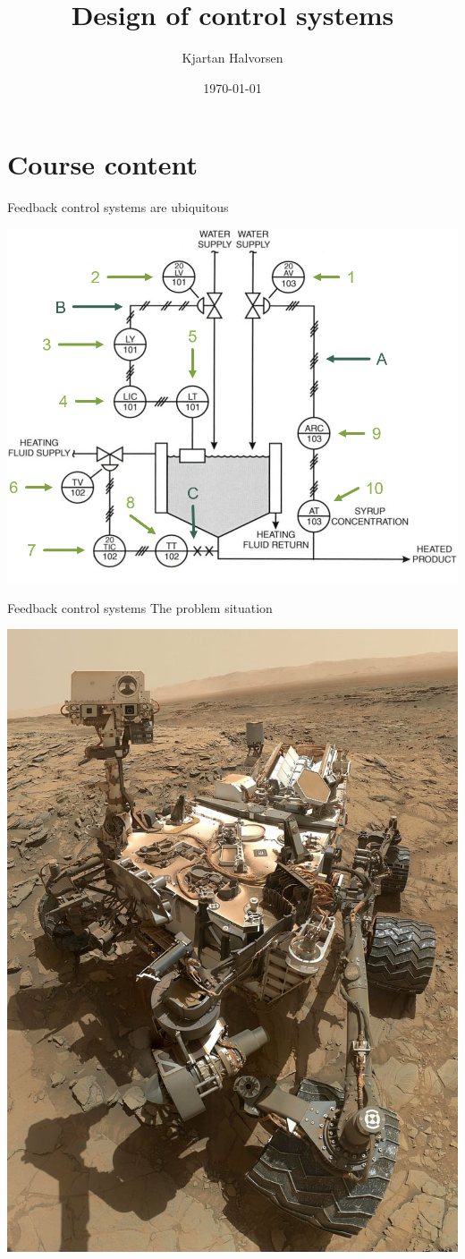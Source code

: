 \documentclass[presentation,aspectratio=169, usenames, dvipsnames]{beamer}
\author{Kjartan Halvorsen}
\date{\today}
\title{Design of control systems}
\begin{document}
\maketitle

\section{Course content}
\label{sec:org971d020}

\begin{frame}[label={sec:org680b461}]{Feedback control systems are ubiquitous}
\begin{center}
  \includegraphics[width=.6\linewidth]{../../figures/PnID-ex.png}
\end{center}
\end{frame}

\begin{frame}[label={sec:orgc3a170a}]{Feedback control systems}
The problem situation

\begin{center}
  \includegraphics[width=.34\linewidth]{../../figures/mars-rover-curiosity-vehicle-cosmos.jpg}
\end{center}
\end{frame}
\end{document}
